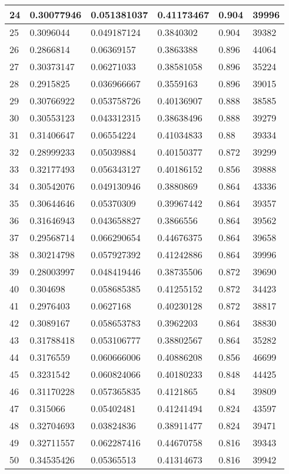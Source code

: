 \begin{longtable}{|l|l|l|l|l|l|}
24 & 0.30077946 & 0.051381037 & 0.41173467 & 0.904 & 39996 \\ \hline 
25 & 0.3096044 & 0.049187124 & 0.3840302 & 0.904 & 39382 \\ \hline 
26 & 0.2866814 & 0.06369157 & 0.3863388 & 0.896 & 44064 \\ \hline 
27 & 0.30373147 & 0.06271033 & 0.38581058 & 0.896 & 35224 \\ \hline 
28 & 0.2915825 & 0.036966667 & 0.3559163 & 0.896 & 39015 \\ \hline 
29 & 0.30766922 & 0.053758726 & 0.40136907 & 0.888 & 38585 \\ \hline 
30 & 0.30553123 & 0.043312315 & 0.38638496 & 0.888 & 39279 \\ \hline 
31 & 0.31406647 & 0.06554224 & 0.41034833 & 0.88 & 39334 \\ \hline 
32 & 0.28999233 & 0.05039884 & 0.40150377 & 0.872 & 39299 \\ \hline 
33 & 0.32177493 & 0.056343127 & 0.40186152 & 0.856 & 39888 \\ \hline 
34 & 0.30542076 & 0.049130946 & 0.3880869 & 0.864 & 43336 \\ \hline 
35 & 0.30644646 & 0.05370309 & 0.39967442 & 0.864 & 39357 \\ \hline 
36 & 0.31646943 & 0.043658827 & 0.3866556 & 0.864 & 39562 \\ \hline 
37 & 0.29568714 & 0.066290654 & 0.44676375 & 0.864 & 39658 \\ \hline 
38 & 0.30214798 & 0.057927392 & 0.41242886 & 0.864 & 39996 \\ \hline 
39 & 0.28003997 & 0.048419446 & 0.38735506 & 0.872 & 39690 \\ \hline 
40 & 0.304698 & 0.058685385 & 0.41255152 & 0.872 & 34423 \\ \hline 
41 & 0.2976403 & 0.0627168 & 0.40230128 & 0.872 & 38817 \\ \hline 
42 & 0.3089167 & 0.058653783 & 0.3962203 & 0.864 & 38830 \\ \hline 
43 & 0.31788418 & 0.053106777 & 0.38802567 & 0.864 & 35282 \\ \hline 
44 & 0.3176559 & 0.060666006 & 0.40886208 & 0.856 & 46699 \\ \hline 
45 & 0.3231542 & 0.060824066 & 0.40180233 & 0.848 & 44425 \\ \hline 
46 & 0.31170228 & 0.057365835 & 0.4121865 & 0.84 & 39809 \\ \hline 
47 & 0.315066 & 0.05402481 & 0.41241494 & 0.824 & 43597 \\ \hline 
48 & 0.32704693 & 0.03824836 & 0.38911477 & 0.824 & 39471 \\ \hline 
49 & 0.32711557 & 0.062287416 & 0.44670758 & 0.816 & 39343 \\ \hline 
50 & 0.34535426 & 0.05365513 & 0.41314673 & 0.816 & 39942 \\ \hline 
\end{longtable}